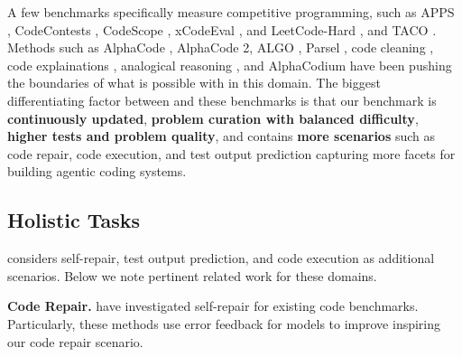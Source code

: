 A few benchmarks specifically measure competitive programming, such as 
APPS \citep{hendrycks2021measuring}, 
CodeContests \citep{li2022competition}, 
CodeScope \citep{yan2023codescope},
xCodeEval \citep{khan2023xcodeeval},
and LeetCode-Hard \citep{shinn2023reflexion}, and TACO \citep{li2023taco}. 
Methods such as AlphaCode \citep{li2022competition}, AlphaCode 2\citep{team2023gemini}, ALGO \citep{zhang2023algo}, Parsel \citep{zelikman2022parsel}, code cleaning \citep{jain2023llm}, code explainations \citep{li2023explaining}, analogical reasoning \citep{yasunaga2023large}, and AlphaCodium \citep{ridnik2024code} have been pushing the boundaries of what is possible with \llms{} in this domain. The biggest differentiating factor between \livecodebench{} and these benchmarks is that our benchmark is \textbf{continuously updated}, \textbf{problem curation with balanced difficulty}, \textbf{higher tests and problem quality}, and contains \textbf{more scenarios} such as code repair, code execution, and test output prediction capturing more facets for building agentic coding systems.

\subsection{Holistic Tasks}
\livecodebench{} considers self-repair, test output prediction, and code execution as additional scenarios. Below we note pertinent related work for these domains. 


\vspace{1pt}
\noindent \textbf{Code Repair.} 
\citep{chen2023teaching, olausson2023demystifying, madaan2023self, peng2023check, zhang2023self} have investigated self-repair for existing code \llm{} benchmarks. Particularly, these methods use error feedback for models to improve inspiring our code repair scenario.


